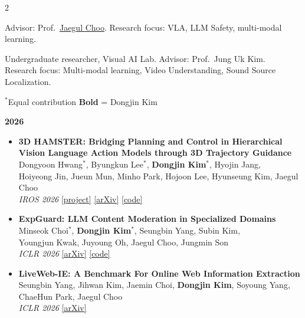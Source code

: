 \documentclass[10pt,a4paper,ragged2e,withhyper]{altacv}
\begin{document}
\begin{paracol}{2}

Advisor: Prof.\ \href{https://sites.google.com/site/jaegulchoo/}{Jaegul Choo}. Research focus: VLA, LLM Safety, multi-modal learning.

\divider

Undergraduate researcher, Visual AI Lab. Advisor: Prof.\ Jung Uk Kim.\\
Research focus: Multi-modal learning, Video Understanding, Sound Source Localization.

{\small ${}^*$Equal contribution \quad \textbf{Bold} = Dongjin Kim}

\medskip
\textcolor{heading}{\textbf{2026}}
\smallskip

\begin{itemize}[leftmargin=1em,nosep,itemsep=3pt]
  \item \textbf{3D HAMSTER: Bridging Planning and Control in Hierarchical\\
        Vision Language Action Models through 3D Trajectory Guidance}\\
        {\small Dongyoon Hwang$^*$, Byungkun Lee$^*$, \textbf{Dongjin Kim}$^*$, Hyojin Jang,\\
        Hoiyeong Jin, Jueun Mun, Minho Park, Hojoon Lee, Hyunseung Kim, Jaegul Choo}\\
        {\footnotesize \textit{IROS 2026} \quad
        \href{https://davian-robotics.github.io/3D_HAMSTER/}{[project]}
        \href{https://arxiv.org/abs/2606.31329}{[arXiv]}
        \href{https://github.com/DAVIAN-Robotics/3D_HAMSTER}{[code]}}

  \item \textbf{ExpGuard: LLM Content Moderation in Specialized Domains}\\
        {\small Minseok Choi$^*$, \textbf{Dongjin Kim}$^*$, Seungbin Yang, Subin Kim,\\
        Youngjun Kwak, Juyoung Oh, Jaegul Choo, Jungmin Son}\\
        {\footnotesize \textit{ICLR 2026} \quad
        \href{https://arxiv.org/abs/2603.02588}{[arXiv]}
        \href{https://github.com/brightjade/ExpGuard}{[code]}}

  \item \textbf{LiveWeb-IE: A Benchmark For Online Web Information Extraction}\\
        {\small Seungbin Yang, Jihwan Kim, Jaemin Choi, \textbf{Dongjin Kim}, Soyoung Yang,\\
        ChaeHun Park, Jaegul Choo}\\
        {\footnotesize \textit{ICLR 2026} \quad
        \href{https://arxiv.org/abs/2603.13773}{[arXiv]}}
\end{itemize}


\end{paracol}
\end{document}
